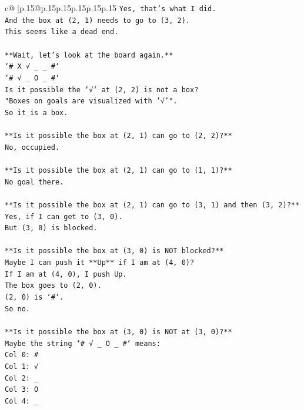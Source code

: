 \documentclass{article}
\begin{document}
{\begin{supertabular}{c@{$\;$}|p{.15\linewidth}@{}p{.15\linewidth}p{.15\linewidth}p{.15\linewidth}p{.15\linewidth}p{.15\linewidth}}
{{{\texttt{Yes, that's what I did.} \\
\texttt{And the box at (2, 1) needs to go to (3, 2).} \\
\texttt{This seems like a dead end.} \\
\\ 
\texttt{**Wait, let's look at the board again.**} \\
\texttt{`\# X √ \_ \_ \#`} \\
\texttt{`\# √ \_ O \_ \#`} \\
\texttt{Is it possible the `√` at (2, 2) is not a box?} \\
\texttt{"Boxes on goals are visualized with '√'".} \\
\texttt{So it is a box.} \\
\\ 
\texttt{**Is it possible the box at (2, 1) can go to (2, 2)?**} \\
\texttt{No, occupied.} \\
\\ 
\texttt{**Is it possible the box at (2, 1) can go to (1, 1)?**} \\
\texttt{No goal there.} \\
\\ 
\texttt{**Is it possible the box at (2, 1) can go to (3, 1) and then (3, 2)?**} \\
\texttt{Yes, if I can get to (3, 0).} \\
\texttt{But (3, 0) is blocked.} \\
\\ 
\texttt{**Is it possible the box at (3, 0) is NOT blocked?**} \\
\texttt{Maybe I can push it **Up** if I am at (4, 0)?} \\
\texttt{If I am at (4, 0), I push Up.} \\
\texttt{The box goes to (2, 0).} \\
\texttt{(2, 0) is `\#`.} \\
\texttt{So no.} \\
\\ 
\texttt{**Is it possible the box at (3, 0) is NOT at (3, 0)?**} \\
\texttt{Maybe the string `\# √ \_ O \_ \#` means:} \\
\texttt{Col 0: \#} \\
\texttt{Col 1: √} \\
\texttt{Col 2: \_} \\
\texttt{Col 3: O} \\
\texttt{Col 4: \_} \\
}}}
\end{supertabular}}
\end{document}
